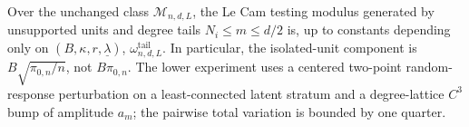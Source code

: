Over the unchanged class \(\mathcal M_{n,d,L}\), the Le Cam testing modulus generated by unsupported units and degree tails \(N_i\le m\le d/2\) is, up to constants depending only on \((B,\kappa,r,\underline\lambda)\), \(\omega^{\mathrm{tail}}_{n,d,L}\). In particular, the isolated-unit component is \(B\sqrt{\pi_{0,n}/n}\), not \(B\pi_{0,n}\). The lower experiment uses a centered two-point random-response perturbation on a least-connected latent stratum and a degree-lattice \(C^3\) bump of amplitude \(a_m\); the pairwise total variation is bounded by one quarter.